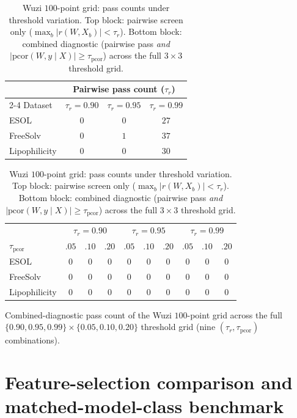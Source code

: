 \documentclass[11pt,a4paper]{article}
\begin{document}
\begin{table}[!htbp]
\centering
\small
\caption{Wuzi $100$-point grid: pass counts under threshold variation. Top block: pairwise screen only ($\max_b\lvert r(W, X_b)\rvert < \tau_r$). Bottom block: combined diagnostic (pairwise pass \emph{and} $\lvert\mathrm{pcor}(W, y \mid X)\rvert \ge \tau_{\mathrm{pcor}}$) across the full $3 \times 3$ threshold grid.}
\label{tab:threshold_sensitivity}
\begin{tabular}{lccc}
\toprule
& \multicolumn{3}{c}{Pairwise pass count ($\tau_r$)}\\
\cmidrule(lr){2-4}
Dataset & $\tau_r = 0.90$ & $\tau_r = 0.95$ & $\tau_r = 0.99$\\
\midrule
ESOL          & $0$ & $0$ & $27$\\
FreeSolv      & $0$ & $1$ & $37$\\
Lipophilicity & $0$ & $0$ & $30$\\
\bottomrule
\end{tabular}

\vspace{0.6em}

\begin{tabular}{l|ccc|ccc|ccc}
\toprule
& \multicolumn{3}{c|}{$\tau_r = 0.90$} & \multicolumn{3}{c|}{$\tau_r = 0.95$} & \multicolumn{3}{c}{$\tau_r = 0.99$}\\
$\tau_{\mathrm{pcor}}$ & $.05$ & $.10$ & $.20$ & $.05$ & $.10$ & $.20$ & $.05$ & $.10$ & $.20$\\
\midrule
ESOL          & $0$ & $0$ & $0$ & $0$ & $0$ & $0$ & $0$ & $0$ & $0$\\
FreeSolv      & $0$ & $0$ & $0$ & $0$ & $0$ & $0$ & $0$ & $0$ & $0$\\
Lipophilicity & $0$ & $0$ & $0$ & $0$ & $0$ & $0$ & $0$ & $0$ & $0$\\
\bottomrule
\end{tabular}

\vspace{0.3em}
\noindent\small{Combined-diagnostic pass count of the Wuzi $100$-point grid across the full $\{0.90, 0.95, 0.99\} \times \{0.05, 0.10, 0.20\}$ threshold grid (nine $(\tau_r, \tau_{\mathrm{pcor}})$ combinations).}
\end{table}

\section{Feature-selection comparison and matched-model-class benchmark}
\end{document}
